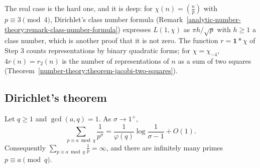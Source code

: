 \begin{remark}\label{analytic-number-theory:remark-l-one}
The real case is the hard one, and it is deep: for $\chi(n) = (\frac np)$ with $p \equiv 3 \pmod 4$, Dirichlet's class number formula (Remark~\ref{analytic-number-theory:remark-class-number-formula})
expresses $L(1, \chi)$ as $\pi h/\sqrt{p}$ with $h \geq 1$ a class number, which is another proof that it is not zero. The function $r = \mathbf{1} * \chi$ of Step 3 counts representations by binary
quadratic forms; for $\chi = \chi_{-4}$, $4r(n) = r_2(n)$ is the number of representations of $n$ as a sum of two squares (Theorem~\ref{number-theory:theorem-jacobi-two-squares}).
\end{remark}

\subsection{Dirichlet's theorem}\label{analytic-number-theory:subsection-dirichlet-theorem}

\begin{theorem}[Dirichlet]\label{analytic-number-theory:theorem-dirichlet}
Let $q \geq 1$ and $\gcd(a, q) = 1$. As $\sigma \to 1^+$,
\[
\sum_{p \equiv a \bmod q}\frac{1}{p^\sigma} = \frac{1}{\varphi(q)}\log\frac{1}{\sigma - 1} + O(1).
\]
Consequently $\sum_{p \equiv a \bmod q}\frac1p = \infty$, and there are infinitely many primes $p \equiv a \pmod q$.
\end{theorem}

